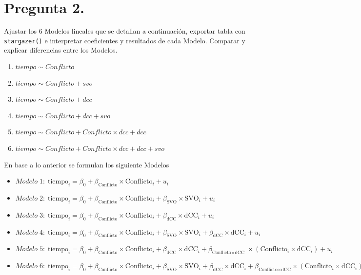 \documentclass[
  spanish,
  10pt,
]{article}
\begin{document}
\newpage

\section{Pregunta 2.}\label{pregunta-2.}

Ajustar los 6 Modelos lineales que se detallan a continuación, exportar
tabla con \texttt{stargazer()} e interpretar coeficientes y resultados
de cada Modelo. Comparar y explicar diferencias entre los Modelos.

\begin{enumerate}
\def\labelenumi{(\alph{enumi})}
\item
  \(tiempo \sim Conflicto\)
\item
  \(tiempo \sim Conflicto + svo\)
\item
  \(tiempo \sim Conflicto + dcc\)
\item
  \(tiempo \sim Conflicto + dcc + svo\)
\item
  \(tiempo \sim Conflicto + Conflicto \times dcc + dcc\)
\item
  \(tiempo \sim Conflicto + Conflicto \times dcc + dcc + svo\)
\end{enumerate}

En base a lo anterior se formulan los siguiente Modelos

\begin{itemize}
\item
  \(Modelo\;1:\; \text{tiempo}_i= \beta_0 + \beta_{\text{Conflicto}}\times\text{Conflicto}_i+ u_i\)
\item
  \(Modelo\;2:\; \text{tiempo}_i= \beta_0 + \beta_{\text{Conflicto}}\times\text{Conflicto}_i + \beta_{\text{SVO}}\times\text{SVO}_i+ u_i\)
\item
  \(Modelo \; 3:\; \text{tiempo}_i= \beta_0 + \beta_{\text{Conflicto}}\times\text{Conflicto}_i + \beta_{\text{dCC}}\times\text{dCC}_i+ u_i\)
\item
  \(Modelo\;4:\; \text{tiempo}_i = \beta_0 + \beta_{\text{Conflicto}}\times\text{Conflicto}_i+ \beta_{\text{SVO}}\times\text{SVO}_i+ \beta_{\text{dCC}}\times\text{dCC}_i+ u_i\)
\item
  \(Modelo\;5:\; \text{tiempo}_i= \beta_0 + \beta_{\text{Conflicto}}\times\text{Conflicto}_i + \beta_{\text{dCC}}\times\text{dCC}_i + \beta_{\text{Conflicto}\times\text{dCC}}\;      \times(\text{Conflicto}_i\times\text{dCC}_i) + u_i\)
\item
  \(Modelo\;6:\; \text{tiempo}_i = \beta_0 + \beta_{\text{Conflicto}}\times\text{Conflicto}_i + \beta_{\text{SVO}}\times\text{SVO}_i + \beta_{\text{dCC}}\times\text{dCC}_i + \beta_{\text{Conflicto}\times\text{dCC}}\times(\text{Conflicto}_i\times\text{dCC}_i) + u_i\)
\end{itemize}
\end{document}
